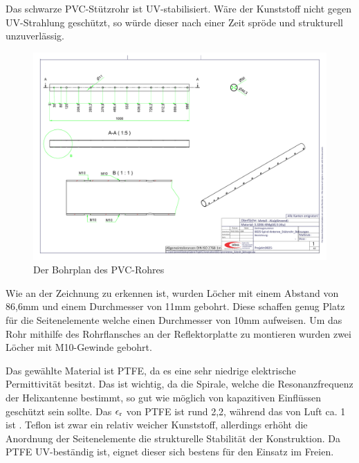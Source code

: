 Das schwarze PVC-Stützrohr ist UV-stabilisiert. Wäre der Kunststoff nicht gegen UV-Strahlung geschützt, so würde dieser nach einer Zeit spröde und strukturell unzuverlässig.

\begin{figure}[H]
	\centering
	\includegraphics[width=\textwidth]{../ref/0025-Spiral-Antenne_St_tzrohr_Bohrungen.pdf}
	\caption{Der Bohrplan des PVC-Rohres}
	\label{fig:PVCU-Rohr-Bohrplan}
\end{figure}

Wie an der Zeichnung zu erkennen ist, wurden Löcher mit einem Abstand von 86,6mm und einem Durchmesser von 11mm gebohrt. Diese schaffen genug Platz für die Seitenelemente welche einen Durchmesser von 10mm aufweisen. Um das Rohr mithilfe des Rohrflansches an der Reflektorplatte zu montieren wurden zwei Löcher mit M10-Gewinde gebohrt. 

Das gewählte Material ist PTFE, da es eine sehr niedrige elektrische Permittivität besitzt. Das ist wichtig, da die Spirale, welche die Resonanzfrequenz der Helixantenne bestimmt, so gut wie möglich von kapazitiven Einflüssen geschützt sein sollte. Das $\epsilon\textsubscript{r}$ von PTFE ist rund 2,2, während das von Luft ca. 1 ist \cite{lipinski_polytetrafluorethylen_nodate,noauthor_dielektrizitatskonstante_nodate}. Teflon ist zwar ein relativ weicher Kunststoff, allerdings erhöht die Anordnung der Seitenelemente die strukturelle Stabilität der Konstruktion. Da PTFE UV-beständig ist, eignet dieser sich bestens für den Einsatz im Freien.

